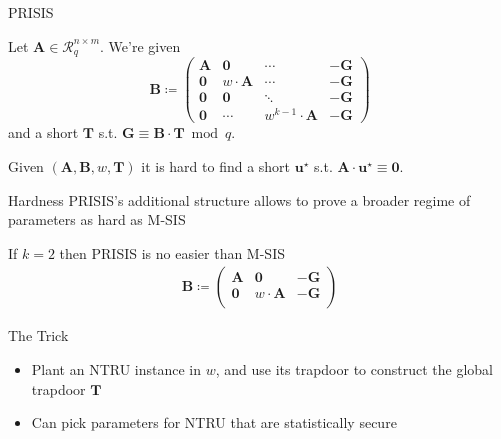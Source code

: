 \documentclass[xcolor=table,10pt,aspectratio=169]{beamer}
\renewcommand{\vec}[1]{\ensuremath{\mathbf{#1}}\xspace}
\providecommand{\mat}[1]{\ensuremath{\vec{#1}}\xspace}
\providecommand{\ring}[0]{\ensuremath{\mathcal{R}}\xspace}
\begin{document}
\begin{frame}[label={sec:orgfc7804b}]{PRISIS}
\begin{definition}[PRISIS]
Let \(\mat{A} \in \ring_{q}^{n \times m}\). We're given
\[\vec{B} \coloneqq \begin{pmatrix}
\mat{A} &               \vec{0} & \cdots & - \vec{G}\\
\vec{0} &           w \cdot \mat{A} & \cdots & -\vec{G}\\
\mat{0} &               \vec{0} & \ddots & -\vec{G}\\
\vec{0} & \cdots & w^{k-1} \cdot \mat{A} & -\vec{G}
\end{pmatrix}\] and a short \(\vec{T}\) s.t. \(\vec{G} \equiv \vec{B} \cdot \vec{T} \bmod q.\)

Given \((\mat{A}, \mat{B}, w, \vec{T})\) it is hard to find a short \(\vec{u}^{\star}\) s.t. \(\mat{A} \cdot \vec{u}^{\star} \equiv \vec{0}\).
\end{definition}

{\footnotesize {} \par}
\end{frame}

\begin{frame}[label={sec:orgd396b45}]{Hardness}
PRISIS's additional structure allows to prove a broader regime of parameters as hard as M-SIS

\begin{alertblock}{If \(k=2\) then PRISIS is no easier than M-SIS}
\begin{align*}
\vec{B} \coloneqq  \begin{pmatrix}
\mat{A} &               \vec{0} & -\vec{G}\\
\vec{0} &           w \cdot \mat{A} & -\vec{G}\\
\end{pmatrix}
\end{align*}
\end{alertblock}

\begin{block}{The Trick}
\begin{itemize}
\item Plant an NTRU instance in \(w\), and use its trapdoor to construct the global trapdoor \(\mat{T}\)
\item Can pick parameters for NTRU that are statistically secure
\end{itemize}
\end{block}
\end{frame}
\end{document}
